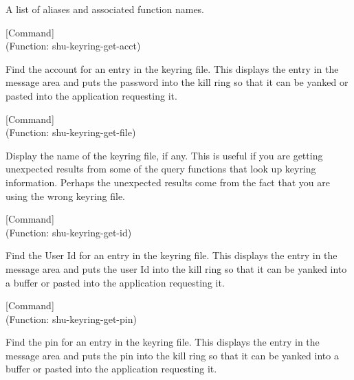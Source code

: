 A list of aliases and associated function names.



\vspace{1em}
\noindent
{}
\usebox{\funcname}
 \hfill [Command]\\%
 (Function: shu-keyring-get-acct)

\begin{doc-string}
Find the account for an entry in the keyring file.  This displays the entry in the message
area and puts the password into the kill ring so that it can be yanked or pasted into the application
requesting it.
\end{doc-string}

\vspace{1em}
\noindent
{}
\usebox{\funcname}
 \hfill [Command]\\%
 (Function: shu-keyring-get-file)

\begin{doc-string}
Display the name of the keyring file, if any.  This is useful if you are
getting unexpected results from some of the query functions that look up keyring
information.  Perhaps the unexpected results come from the fact that you are
using the wrong keyring file.
\end{doc-string}

\vspace{1em}
\noindent
{}
\usebox{\funcname}
 \hfill [Command]\\%
 (Function: shu-keyring-get-id)

\begin{doc-string}
Find the User Id for an entry in the keyring file.  This displays the entry
in the message area and puts the user Id into the kill ring so that it can be
yanked into a buffer or pasted into the application requesting it.
\end{doc-string}

\vspace{1em}
\noindent
{}
\usebox{\funcname}
 \hfill [Command]\\%
 (Function: shu-keyring-get-pin)

\begin{doc-string}
Find the pin for an entry in the keyring file.  This displays the entry in
the message area and puts the pin into the kill ring so that it can be yanked
into a buffer or pasted into the application requesting it.
\end{doc-string}

